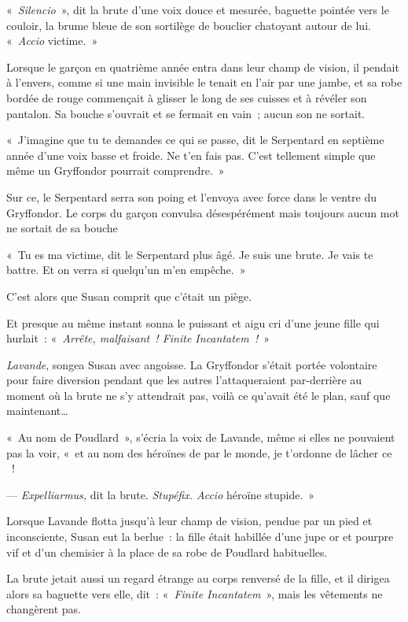 «~\emph{Silencio}~», dit la brute d'une voix douce et mesurée, baguette pointée vers le couloir, la brume bleue de son sortilège de bouclier chatoyant autour de lui. «~\emph{Accio} victime.~»

Lorsque le garçon en quatrième année entra dans leur champ de vision, il pendait à l'envers, comme si une main invisible le tenait en l'air par une jambe, et sa robe bordée de rouge commençait à glisser le long de ses cuisses et à révéler son pantalon. Sa bouche s'ouvrait et se fermait en vain~; aucun son ne sortait.

«~J'imagine que tu te demandes ce qui se passe, dit le Serpentard en septième année d'une voix basse et froide. Ne t'en fais pas. C'est tellement simple que même un Gryffondor pourrait comprendre.~»

Sur ce, le Serpentard serra son poing et l'envoya avec force dans le ventre du Gryffondor. Le corps du garçon convulsa désespérément mais toujours aucun mot ne sortait de sa bouche

«~Tu es ma victime, dit le Serpentard plus âgé. Je suis une brute. Je vais te battre. Et on verra si quelqu'un m'en empêche.~»

C'est alors que Susan comprit que c'était un piège.

Et presque au même instant sonna le puissant et aigu cri d'une jeune fille qui hurlait~: «~\emph{Arrête, malfaisant~! Finite Incantatem~!}~»

\emph{Lavande}, songea Susan avec angoisse. La Gryffondor s'était portée volontaire pour faire diversion pendant que les autres l'attaqueraient par-derrière au moment où la brute ne s'y attendrait pas, voilà ce qu'avait été le plan, sauf que maintenant…

«~Au nom de Poudlard~», s'écria la voix de Lavande, même si elles ne pouvaient pas la voir, «~et au nom des héroïnes de par le monde, je t'ordonne de lâcher ce ~!

--- \emph{Expelliarmus,} dit la brute. \emph{Stupéfix. Accio} héroïne stupide.~»

Lorsque Lavande flotta jusqu'à leur champ de vision, pendue par un pied et inconsciente, Susan eut la berlue~: la fille était habillée d'une jupe or et pourpre vif et d'un chemisier à la place de sa robe de Poudlard habituelles.

La brute jetait aussi un regard étrange au corps renversé de la fille, et il dirigea alors sa baguette vers elle, dit~: «~\emph{Finite Incantatem}~», mais les vêtements ne changèrent pas.

